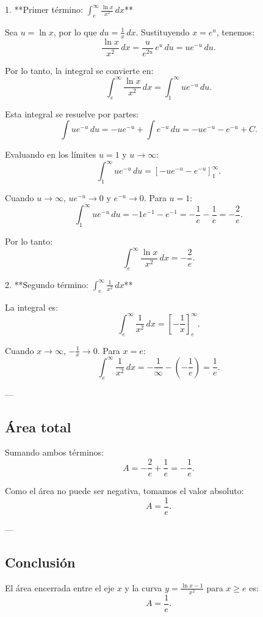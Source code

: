 \documentclass[11pt,letterpaper]{article}
\begin{document}
1. **Primer término: \(\int_{e}^{\infty} \frac{\ln x}{x^2} \, dx\)**

Sea \(u = \ln x\), por lo que \(du = \frac{1}{x} \, dx\). Sustituyendo \(x = e^u\), tenemos:
\[
\frac{\ln x}{x^2} \, dx = \frac{u}{e^{2u}} \, e^u \, du = u e^{-u} \, du.
\]

Por lo tanto, la integral se convierte en:
\[
\int_{e}^{\infty} \frac{\ln x}{x^2} \, dx = \int_{1}^{\infty} u e^{-u} \, du.
\]

Esta integral se resuelve por partes:
\[
\int u e^{-u} \, du = -u e^{-u} + \int e^{-u} \, du = -u e^{-u} - e^{-u} + C.
\]

Evaluando en los límites \(u = 1\) y \(u \to \infty\):
\[
\int_{1}^{\infty} u e^{-u} \, du = \left[ -u e^{-u} - e^{-u} \right]_{1}^{\infty}.
\]

Cuando \(u \to \infty\), \(u e^{-u} \to 0\) y \(e^{-u} \to 0\). Para \(u = 1\):
\[
\int_{1}^{\infty} u e^{-u} \, du = -1 e^{-1} - e^{-1} = -\frac{1}{e} - \frac{1}{e} = -\frac{2}{e}.
\]

Por lo tanto:
\[
\int_{e}^{\infty} \frac{\ln x}{x^2} \, dx = -\frac{2}{e}.
\]

2. **Segundo término: \(\int_{e}^{\infty} \frac{1}{x^2} \, dx\)**

La integral es:
\[
\int_{e}^{\infty} \frac{1}{x^2} \, dx = \left[ -\frac{1}{x} \right]_{e}^{\infty}.
\]

Cuando \(x \to \infty\), \(-\frac{1}{x} \to 0\). Para \(x = e\):
\[
\int_{e}^{\infty} \frac{1}{x^2} \, dx = -\frac{1}{\infty} - \left(-\frac{1}{e}\right) = \frac{1}{e}.
\]

---

\subsection*{Área total}

Sumando ambos términos:
\[
A = -\frac{2}{e} + \frac{1}{e} = -\frac{1}{e}.
\]

Como el área no puede ser negativa, tomamos el valor absoluto:
\[
A = \frac{1}{e}.
\]

---

\subsection*{Conclusión}

El área encerrada entre el eje \(x\) y la curva \(y = \frac{\ln x - 1}{x^2}\) para \(x \geq e\) es:
\[
A = \frac{1}{e}.
\]
\end{document}
